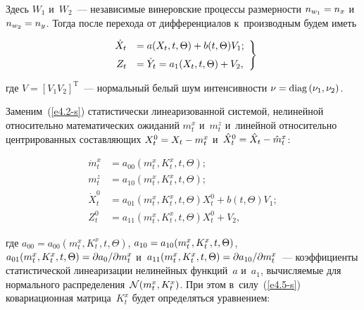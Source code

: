\begin{multicols}{2}
\vspace*{-2pt}

\noindent
Здесь $W_1$ и~$W_2$~--- независимые винеровские процессы
размерности  $n_{w_1}\hm = n_x$ и~$n_{w_2}\hm= n_y$. Тогда после
перехода от дифференциалов к~производным  будем
иметь

\vspace*{4pt}

\noindent
\begin{equation}
\left.
\begin{array}{rl}
\dot X_t& =a(X_t, t,\Theta) + b(t,\Theta) V_1;\\[6pt]
Z_t &=\dot Y_t =a_1 (X_t, t,\Theta) + V_2,
\end{array}
\right\}
\label{e4.2-s}
\end{equation}

\vspace*{-2pt}

\noindent
где  $V=[V_1 V_2]^{\mathrm{T}}$~--- нормальный белый шум интенсивности $\nu\hm=\mathrm{diag} \left(\nu_1,\nu_2\right)$.

Заменим~(\ref{e4.2-s}) статистически линеаризованной системой, нелинейной
относительно математических ожиданий  $m_t^x$ и~$m_t^z$ и~линейной
относительно центрированных составляющих $X_t^0 \hm= X_t \hm- m_t^x$ и~$\hx^0 \hm=\hx \hm-\hat m_t^x$:

\vspace*{-4pt}

\noindent
\begin{align}
\dot m_t^x &=a_{00} \left(m_t^x, K_t^x, t,\Theta\right);\label{e4.3-s}\\
 m_t^z &=a_{10} \left(m_t^x, K_t^x, t,\Theta\right);\label{e4.4-s}\\
\dot X_t^0 &=a_{01} \left(m_t^x, K_t^x, t,\Theta\right) X_t^0 +b(t,\Theta) V_1;\label{e4.5-s}\\
Z_t^0 &=a_{11} \left(m_t^x, K_t^x, t,\Theta\right) X_t^0 + V_2,\label{e4.6-s}
\end{align}

\vspace*{-2pt}

\noindent
где $a_{00}=a_{00} (m_t^x, K_t^x, t,\Theta)$,
$a_{10}\hm=a_{10}(m_t^x, K_t^x, t,\Theta)$, $a_{01}
(m_t^x, K_t^x, t,\Theta)\hm= \prt a_0 /\prt m_t^x$
и~$a_{11} (m_t^x, K_t^x, t,\Theta)\hm=\prt a_{10} /\prt m_t^x$~---
коэффициенты статистической линеаризации нелинейных функций~$a$ и~$a_1$, 
вычисляемые для нормального распределения~${\cal N} (m_t^x, K_t^x)$. При этом в~силу~(\ref{e4.5-s}) 
ковариационная матрица~$K_t^x$ будет определяться уравнением:


\end{multicols}
